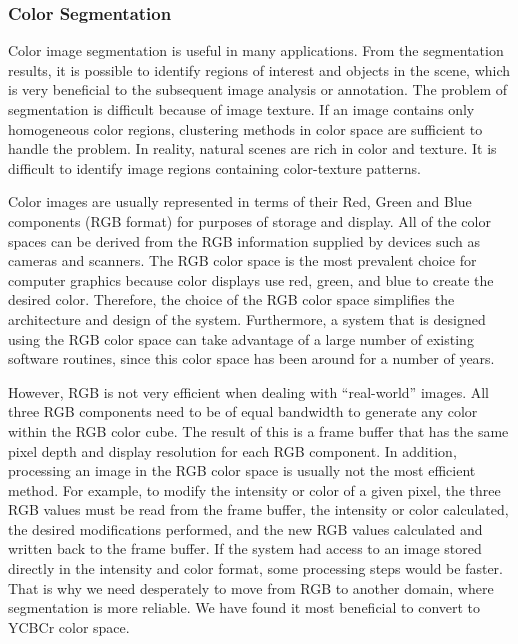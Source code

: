 \documentclass[12pt,fleqn]{book} %
\begin{document}
\subsubsection{Color Segmentation }
Color image segmentation is useful in many applications. From the segmentation results, it is 
possible to identify regions of interest and objects in the scene, which is very beneficial to the 
subsequent image analysis or annotation. The problem of segmentation is difficult because of 
image texture. If an image contains only homogeneous color regions, clustering methods in color 
space are sufficient to handle the problem. In reality, natural scenes are rich in color and texture. 
It is difficult to identify image regions containing color-texture patterns.\bigskip

Color images are usually represented in terms of their Red, Green and Blue components (RGB 
format) for purposes of storage and display. All of the color spaces can be derived from the RGB 
information supplied by devices such as cameras and scanners. The RGB color space is the most 
prevalent choice for computer graphics because color displays use red, green, and blue to create 
the desired color. Therefore, the choice of the RGB color space simplifies the architecture and 
design of the system. Furthermore, a system that is designed using the RGB color space can 
take advantage of a large number of existing software routines, since this color space has been 
around for a number of years.  \bigskip

However, RGB is not very efficient when dealing with “real-world” images. All three RGB 
components need to be of equal bandwidth to generate any color within the RGB color cube. 
The result of this is a frame buffer that has the same pixel depth and display resolution for each RGB component. In addition, processing an image in the RGB color space is usually not the 
most efficient method. For example, to modify the intensity or color of a given pixel, the three 
RGB values must be read from the frame buffer, the intensity or color calculated, the desired 
modifications performed, and the new RGB values calculated and written back to the frame 
buffer. If the system had access to an image stored directly in the intensity and color format, 
some processing steps would be faster. That is why we need desperately to move from RGB to 
another domain, where segmentation is more reliable. We have found it most beneficial to 
convert to YCBCr color space. \bigskip
\end{document}
